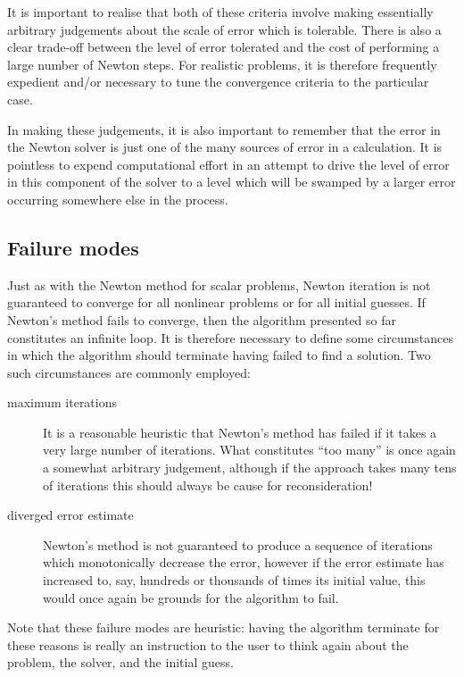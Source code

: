 \documentclass{book}
\begin{document}
It is important to realise that both of these criteria involve making
essentially arbitrary judgements about the scale of error which is
tolerable. There is also a clear trade-off between the level of error
tolerated and the cost of performing a large number of Newton
steps. For realistic problems, it is therefore frequently expedient
and/or necessary to tune the convergence criteria to the particular
case.

In making these judgements, it is also important to remember that the
error in the Newton solver is just one of the many sources of error in
a calculation. It is pointless to expend computational effort in an
attempt to drive the level of error in this component of the solver to
a level which will be swamped by a larger error occurring somewhere
else in the process.


\subsection{Failure modes}
\label{\detokenize{8_nonlinear_problems:failure-modes}}
Just as with the Newton method for scalar problems, Newton iteration
is not guaranteed to converge for all nonlinear problems or for all
initial guesses. If Newton’s method fails to converge, then the
algorithm presented so far constitutes an infinite loop. It is
therefore necessary to define some circumstances in which the
algorithm should terminate having failed to find a solution. Two such
circumstances are commonly employed:
\begin{description}
\item[{maximum iterations}] \leavevmode
It is a reasonable heuristic that Newton’s method has failed if it
takes a very large number of iterations. What constitutes “too
many” is once again a somewhat arbitrary judgement, although if the
approach takes many tens of iterations this should always be cause
for reconsideration!

\item[{diverged error estimate}] \leavevmode
Newton’s method is not guaranteed to produce a sequence of
iterations which monotonically decrease the error, however if the
error estimate has increased to, say, hundreds or thousands of
times its initial value, this would once again be grounds for the
algorithm to fail.

\end{description}

Note that these failure modes are heuristic: having the algorithm
terminate for these reasons is really an instruction to the user to
think again about the problem, the solver, and the initial guess.
\end{document}
